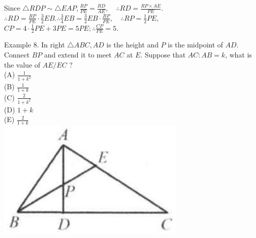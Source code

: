 \documentclass[10pt]{article}
\begin{document}
Since \(\triangle R D P \sim \triangle E A P, \frac{R P}{P E}=\frac{R D}{A E}, \quad \therefore R D=\frac{R P \times A E}{P E}\).\\
\(\therefore R D=\frac{R P}{P E} \cdot \frac{3}{2} E B . \therefore \frac{3}{4} E B=\frac{3}{2} E B \cdot \frac{R P}{P E}, \quad \therefore R P=\frac{1}{2} P E\), \(C P=4 \cdot \frac{1}{2} P E+3 P E=5 P E ; \therefore \frac{C P}{P E}=5\).

Example 8. In right \(\triangle A B C, A D\) is the height and \(P\) is the midpoint of \(A D\).\\
Connect \(B P\) and extend it to meet \(A C\) at \(E\). Suppose that \(A C: A B=k\), what is the value of \(A E / E C\) ?\\
(A) \(\frac{1}{1+k^{2}}\)\\
(B) \(\frac{1}{1+k}\)\\
(C) \(\frac{2}{1+k^{2}}\)\\
(D) \(1+k\)\\
(E) \(\frac{2}{1+k}\)\\
\includegraphics[max width=\textwidth, center]{2025_04_17_97bc1f7e44d93c271a88g-108(1)}
\end{document}
